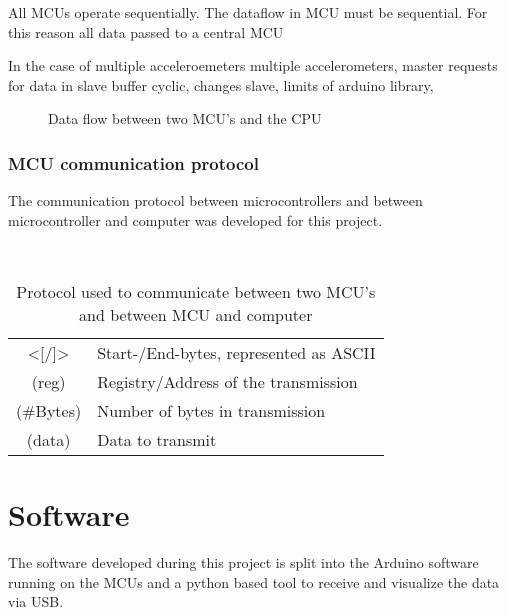 All \acs{MCU}s operate sequentially.
The dataflow in \ac{MCU} must be sequential. For this reason all data passed to a central \ac{MCU}

In the case of multiple acceleroemeters 
multiple accelerometers, master requests for data in slave buffer cyclic, changes slave, limits of arduino library, 

\begin{figure}[!htb]
    \centering
    
    \caption[Data flow]{Data flow between two MCU's and the CPU}
    \label{fig:data_flow}
\end{figure}
\subsubsection{MCU communication protocol}

The communication protocol between microcontrollers and between microcontroller and computer was developed for this project.
 
\begin{table}[!htb]
    \centering
    
    \\[0.5em]
    \footnotesize
		\begin{tabular}{c@{ :\hskip 0.5em}l}
			\toprule
            \large{\textcolor{WesMixL8qual6}{<[}/\textcolor{WesMixL8qual6}{]>}} & Start-/End-bytes, represented as \ac{ASCII}\\
            \textcolor{WesMixL8qual0}{\large (reg)} & Registry/Address of the transmission\\
            \textcolor{WesMixL8qual4}{\large (\#Bytes)} & Number of bytes in transmission\\
            \textcolor{WesMixL8qual5}{\large (data)} & Data to transmit\\
			\bottomrule
		\end{tabular}
	\normalsize
    \caption[MCU communication protocol]{Protocol used to communicate between two MCU's and between MCU and computer}
    \label{tab:mcu_com_protocol}
\end{table}

\section{Software}

The software developed during this project is split into the Arduino software running on the \acs{MCU}s and a python based tool to receive and visualize the data via \ac{USB}.

